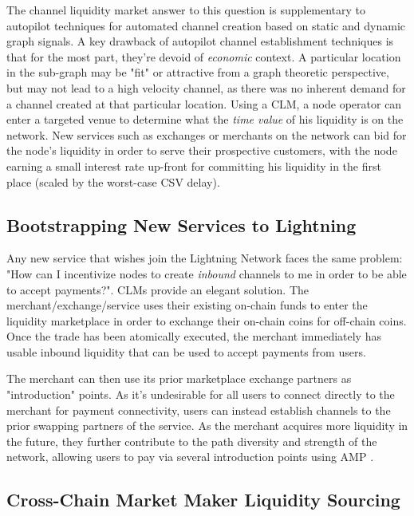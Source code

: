 \documentclass[10pt,a4paper]{article}
\theoremstyle{definition}
\begin{document}
The channel liquidity market answer to this question is supplementary to
autopilot \cite{autopilot} techniques for automated channel creation based on
static and dynamic graph signals. A key drawback of autopilot channel
establishment techniques is that for the most part, they're devoid of
\emph{economic} context. A particular location in the sub-graph may be "fit" or
attractive from a graph theoretic perspective, but may not lead to a high
velocity channel, as there was no inherent demand for a channel created at that
particular location. Using a CLM, a node operator can enter a targeted venue to
determine what the \emph{time value} of his liquidity is on the network. New
services such as exchanges or merchants on the network can bid for the node's
liquidity in order to serve their prospective customers, with the node earning
a small interest rate up-front for committing his liquidity in the first place
(scaled by the worst-case CSV delay). 

\subsection{Bootstrapping New Services to Lightning} 

Any new service that wishes join the Lightning Network faces the same problem:
"How can I incentivize nodes to create \emph{inbound} channels to me in order
to be able to accept payments?". CLMs provide an elegant solution. The
merchant/exchange/service uses their existing on-chain funds to enter the
liquidity marketplace in order to exchange their on-chain coins for off-chain
coins. Once the trade has been atomically executed, the merchant immediately
has usable inbound liquidity that can be used to accept payments from users. 

The merchant can then use its prior marketplace exchange partners as
"introduction" points. As it's undesirable for all users to connect directly to
the merchant for payment connectivity, users can instead establish channels to
the prior swapping partners of the service. As the merchant acquires more
liquidity in the future, they further contribute to the path diversity and
strength of the network, allowing users to pay via several introduction points
using AMP \cite{amp}. 

\subsection{Cross-Chain Market Maker Liquidity Sourcing} 
\end{document}
